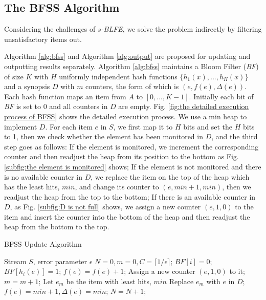 \documentclass[conference]{IEEEtran}
\begin{document}
\subsection{The BFSS Algorithm}\label{sec:bfss}
Considering the challenges of $s$\emph{-BLFE}, we solve the problem indirectly by filtering unsatisfactory items out.\par
Algorithm \ref{alg:bfss} and Algorithm \ref{alg:output} are proposed for updating and outputting results separately. Algorithm \ref{alg:bfss} maintains a Bloom Filter (\emph{BF}) of size $K$ with $H$ uniformly independent hash functions $\{h_1(x),...,h_H(x)\}$ and a synopsis $D$ with $m$ counters, the form of which is $(e, f(e), \Delta(e))$. Each hash function maps an item from $A$ to $[0,...,K-1]$. Initially each bit of \emph{BF} is set to 0 and all counters in $D$ are empty. Fig. \ref{fig:the detailed execution process of BFSS} shows the detailed execution process. We use a min heap to implement $D$. For each item $e$ in $S$, we first map it to $H$ bits and set the $H$ bits to 1, then we check whether the element has been monitored in $D$, and the third step goes as follows: If the element is monitored, we increment the corresponding counter and then readjust the heap from its position to the bottom as Fig. \ref{subfig:the element is monitored} shows; If the element is not monitored and there is no available counter in $D$, we replace the item on the top of the heap which has the least hits, $min$, and change its counter to $(e, min+1, min)$, then we readjust the heap from the top to the bottom; If there is an available counter in $D$, as Fig. \ref{subfig:D is not full} shows, we assign a new counter $(e, 1, 0)$ to the item and insert the counter into the bottom of the heap and then readjust the heap from the bottom to the top.

\begin{algorithm}[h]
	\caption{BFSS Update Algorithm}
	\label{alg:bfss}
\begin{algorithmic}[1]
	\REQUIRE Stream $S$, error parameter $\epsilon$
	\STATE $N=0,m=0,C=\lceil 1/\epsilon\rceil$;
	\STATE $BF[i]=0$;
	\ENDFOR
	\STATE $BF[h_i(e)]=1$;
	\ENDFOR
	\STATE $f(e)=f(e)+1$;
	\STATE Assign a new counter $(e,1,0)$ to it;
	\STATE $m=m+1$;
	\ELSE
	\STATE Let $e_m$ be the item with least hits, $min$
	\STATE Replace $e_m$ with $e$ in $D$;
	\STATE $f(e)=min+1,\Delta(e)=min$;
	\ENDIF
	\STATE $N=N+1$;
	\ENDFOR
\end{algorithmic}
\end{algorithm}
\end{document}
